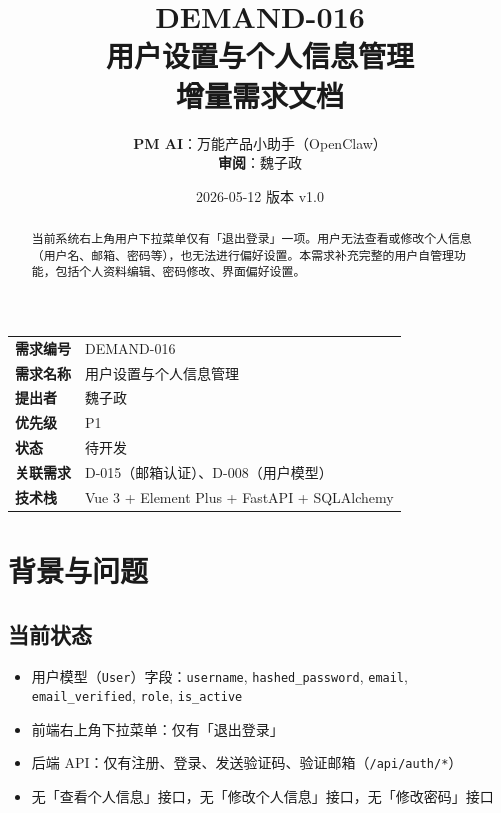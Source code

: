 \documentclass[11pt,a4paper]{article}
\title{
\vspace{-1em}
{\Huge\bfseries\color{primary} DEMAND-016}\\[0.6em]
{\Large\bfseries\color{accent} 用户设置与个人信息管理}\\[0.4em]
{\large 增量需求文档}
}
\author{
\textbf{PM AI}：万能产品小助手（OpenClaw）\\[0.3em]
\textbf{审阅}：魏子政
}
\date{2026-05-12 \quad 版本 v1.0}
\begin{document}
\maketitle
\thispagestyle{empty}

\begin{center}
\begin{tabular}{>{\bfseries}p{3cm} p{10cm}}
\toprule
需求编号 & DEMAND-016 \\
需求名称 & 用户设置与个人信息管理 \\
提出者 & 魏子政 \\
优先级 & \textcolor{warning}{P1} \\
状态 & 待开发 \\
关联需求 & D-015（邮箱认证）、D-008（用户模型） \\
技术栈 & Vue 3 + Element Plus + FastAPI + SQLAlchemy \\
\bottomrule
\end{tabular}
\end{center}

\vspace{1em}

\begin{abstract}
当前系统右上角用户下拉菜单仅有「退出登录」一项。用户无法查看或修改个人信息（用户名、邮箱、密码等），也无法进行偏好设置。本需求补充完整的用户自管理功能，包括个人资料编辑、密码修改、界面偏好设置。
\end{abstract}

\newpage
\tableofcontents
\newpage

\section{背景与问题}

\subsection{当前状态}

\begin{itemize}[nosep]
  \item 用户模型（\texttt{User}）字段：\texttt{username}, \texttt{hashed\_password}, \texttt{email}, \texttt{email\_verified}, \texttt{role}, \texttt{is\_active}
  \item 前端右上角下拉菜单：仅有「退出登录」
  \item 后端 API：仅有注册、登录、发送验证码、验证邮箱（\texttt{/api/auth/*}）
  \item 无「查看个人信息」接口，无「修改个人信息」接口，无「修改密码」接口
\end{itemize}
\end{document}
